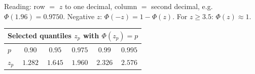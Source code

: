\documentclass[a4paper]{article}
\theoremstyle{break}
\begin{document}
\begin{table}[H]
\medskip
{\footnotesize Reading: row $=$ $z$ to one decimal, column $=$ second decimal, e.g.\ $\Phi(1.96)=0.9750$.
Negative $z$: $\Phi(-z)=1-\Phi(z)$. For $z\ge 3.5$: $\Phi(z)\approx 1$.\par}

\medskip
{\footnotesize\renewcommand{\arraystretch}{1.2}
\begin{tabular}{lccccc}
\toprule
\multicolumn{6}{l}{Selected quantiles $z_p$ with $\Phi(z_p)=p$}\\
\midrule
$p$ & $0.90$ & $0.95$ & $0.975$ & $0.99$ & $0.995$\\
$z_p$ & $1.282$ & $1.645$ & $1.960$ & $2.326$ & $2.576$\\
\bottomrule
\end{tabular}\par}
\end{table}
\pagebreak
\end{document}
